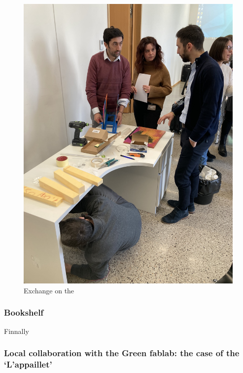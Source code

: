 \documentclass[
  11pt,
]{article}
\begin{document}
\begin{figure}
\begin{minipage}[t]{0.33\linewidth}
{{\includegraphics{figures/demos/desk/desk-05.jpg}

}

}

\end{minipage}%

\caption{\label{fig-desk-final}Exchange on the}

\end{figure}

\hypertarget{bookshelf}{%
\subsubsection{Bookshelf}\label{bookshelf}}

Finnally

\hypertarget{local-collaboration-with-the-green-fablab-the-case-of-the-lappaillet}{%
\subsubsection{Local collaboration with the Green fablab: the case of
the
`L'appaillet'}\label{local-collaboration-with-the-green-fablab-the-case-of-the-lappaillet}}
\end{document}
